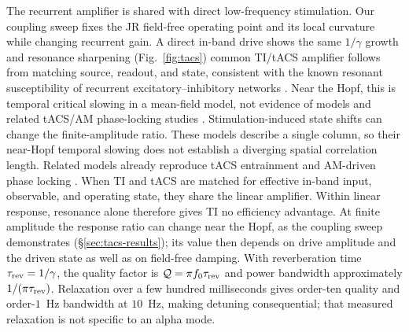 \documentclass[11pt,a4paper]{article}
\providecommand{\DIFaddtex}[1]{{\protect\color{blue} \sf #1}} %
\providecommand{\DIFdeltex}[1]{{\protect\color{red} \scriptsize #1}} %
\providecommand{\DIFaddbegin}{} %
\providecommand{\DIFaddend}{} %
\providecommand{\DIFdelbegin}{} %
\providecommand{\DIFdelend}{} %
\providecommand{\DIFadd}[1]{\texorpdfstring{\DIFaddtex{#1}}{#1}} %
\providecommand{\DIFdel}[1]{\texorpdfstring{\DIFdeltex{#1}}{}} %
\begin{document}
The \DIFdelbegin \DIFdel{recurrent amplifier is shared with direct low-frequency stimulation. Our
coupling sweep fixes the JR field-free operating point and its local curvature
while changing recurrent gain. A direct in-band drive shows the same
$1/\gamma$ growth and resonance sharpening (Fig.~\ref{fig:tacs})}\DIFdelend \DIFaddbegin \DIFadd{common TI/tACS amplifier follows from matching source, readout, and state}\DIFaddend ,
consistent with \DIFdelbegin \DIFdel{the known resonant susceptibility of recurrent }\DIFdelend excitatory--inhibitory \DIFdelbegin \DIFdel{networks
\cite{ledoux2011,clusella2023}
. Near the Hopf,
this is temporal critical slowing in a mean-field model, not evidence of }\DIFdelend \DIFaddbegin \DIFadd{models \cite{ledoux2011,clusella2023}
and related tACS/AM phase-locking studies
\cite{ali2013,negahbani2018,krause2023}. Stimulation-induced state shifts can
change the finite-amplitude ratio. These models describe a single column,
so their near-Hopf temporal slowing does not establish }\DIFaddend a diverging spatial
correlation length. \DIFdelbegin \DIFdel{Related models already reproduce tACS entrainment and AM-driven phase locking
\cite{ali2013,negahbani2018,krause2023}. When TI and tACS are matched
for effective in-band input, observable, and operating state, they share the linear amplifier.
Within linear response, resonance alone therefore gives
TI
no efficiency advantage. At finite amplitude the response ratio can change near
the Hopf, as the coupling sweep demonstrates (\S\ref{sec:tacs-results}); its value then
depends on drive amplitude and the driven state as well as on field-free damping.
}\DIFdelend \DIFaddbegin \DIFadd{With reverberation time
$\tau_{\rm rev}=1/\gamma$, the quality factor is $\mathcal Q=\pi f_0\tau_{\rm rev}$
and power bandwidth approximately $1/(\pi\tau_{\rm rev})$.
Relaxation over a few hundred milliseconds \cite{wilting2018} gives
order-ten quality and order-$1$~Hz bandwidth at $10$~Hz, making detuning
consequential; that measured relaxation is not specific to an alpha mode.
}\DIFaddend
\end{document}
